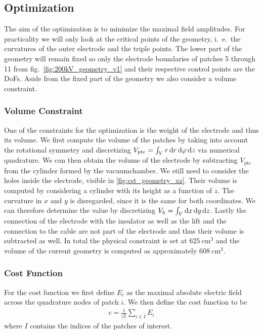 \subsection{Optimization}
The aim of the optimization is to minimize the maximal field amplitudes. For practicality we will only look at the critical points of the geometry, i.~e.~the curvatures of the outer electrode and the triple points. The lower part of the geometry will remain fixed so only the electrode boundaries of patches 5 through 11 from fig.~\ref{fig:200kV_geometry_v1} and their respective control points are the DoFs. Aside from the fixed part of the geometry we also consider a volume constraint.

\subsubsection{Volume Constraint}
One of the constraints for the optimization is the weight of the electrode and thus its volume.
We first compute the volume of the patches by taking into account the rotational symmetry and discretizing $V_{\mathrm{ptc}} = \int_V r\, \mathrm{d} r\, \mathrm{d} \varphi\, \mathrm{d} z$ via numerical quadrature. We can then obtain the volume of the electrode by subtracting $V_{\mathrm{ptc}}$ from the cylinder formed by the vacuumchamber.
We still need to consider the holes inside the electrode, visible in \ref{fig:cst_geometry_xz}. Their volume is computed by considering a cylinder with its height as a function of $z$. The curvature in $x$ and $y$ is disregarded, since it is the same for both coordinates. We can therefore determine the value by discretizing $V_{h} = \int_V \mathrm{d} x\, \mathrm{d} y\, \mathrm{d} z$.
Lastly the connection of the electrode with the insulator as well as the lift and the connection to the cable are not part of the electrode and thus their volume is subtracted as well.
In total the physical constraint is set at $625\ \mathrm{cm}^3$ and the volume of the current geometry is computed as approximately $608\ \mathrm{cm}^3$.

\subsubsection{Cost Function}
For the cost function we first define $E_i$ as the maximal absolute electric field across the quadrature nodes of patch $i$.
We then define the cost function to be
\begin{align}
   c = \frac{1}{|I|} \sum_{i \in I} E_i
\end{align}
where $I$ contains the indices of the patches of interest.

